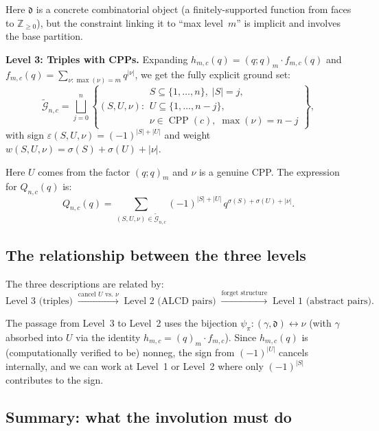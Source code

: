 \documentclass[11pt]{article}
\newcommand{\Z}{\mathbb{Z}}
\newcommand{\CPP}{\operatorname{CPP}}
\newcommand{\qpochn}[3]{(#1;#2)_{#3}}
\theoremstyle{plain}
\theoremstyle{definition}
\begin{document}
Here $\mathfrak{d}$ is a concrete combinatorial object (a finitely-supported
function from faces to $\Z_{\geq 0}$), but the constraint linking it
to ``max level~$m$'' is implicit and involves the base partition.

\medskip
\noindent\textbf{Level 3: Triples with CPPs.}
Expanding $h_{m,c}(q) = \qpochn{q}{q}{m} \cdot f_{m,c}(q)$
and $f_{m,c}(q) = \sum_{\nu:\max(\nu)=m} q^{|\nu|}$, we get the
fully explicit ground set:
\begin{equation}\label{eq:G-triples}
  \widetilde{\mathcal{G}}_{n,c} =
  \bigsqcup_{j=0}^{n}
  \left\{(S, U, \nu) :
    \begin{array}{l}
      S \subseteq \{1,\ldots,n\},\; |S| = j, \\[2pt]
      U \subseteq \{1,\ldots,n-j\}, \\[2pt]
      \nu \in \CPP(c),\; \max(\nu) = n - j
    \end{array}
  \right\},
\end{equation}
with sign $\varepsilon(S, U, \nu) = (-1)^{|S| + |U|}$ and weight
$w(S, U, \nu) = \sigma(S) + \sigma(U) + |\nu|$.

Here $U$ comes from the factor $\qpochn{q}{q}{m}$ and $\nu$ is a
genuine CPP.  The expression for $Q_{n,c}(q)$ is:
\begin{equation}
  Q_{n,c}(q) = \sum_{(S, U, \nu) \in \widetilde{\mathcal{G}}_{n,c}}
  (-1)^{|S|+|U|}\, q^{\sigma(S)+\sigma(U)+|\nu|}.
\end{equation}


\subsection{The relationship between the three levels}

The three descriptions are related by:
\[
  \text{Level 3 (triples)}
  \;\xrightarrow{\text{cancel $U$ vs.\ $\nu$}}\;
  \text{Level 2 (ALCD pairs)}
  \;\xrightarrow{\text{forget structure}}\;
  \text{Level 1 (abstract pairs)}.
\]

The passage from Level~3 to Level~2 uses the bijection
$\psi_\pi\colon (\gamma, \mathfrak{d}) \leftrightarrow \nu$ (with
$\gamma$ absorbed into $U$ via the identity
$h_{m,c} = (q)_m \cdot f_{m,c}$).  Since $h_{m,c}(q)$ is
(computationally verified to be) nonneg, the sign from $(-1)^{|U|}$
cancels internally, and we can work at Level~1 or Level~2 where only
$(-1)^{|S|}$ contributes to the sign.


\subsection{Summary: what the involution must do}
\end{document}
